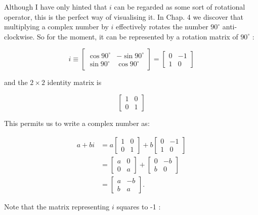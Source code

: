 \documentclass[10pt]{article}
\begin{document}
Although I have only hinted that $i$ can be regarded as some sort of rotational operator, this is the perfect way of visualising it. In Chap. 4 we discover that multiplying a complex number by $i$ effectively rotates the number $90^{\circ}$ anti-clockwise. So for the moment, it can be represented by a rotation matrix of $90^{\circ}$ :

$$
i \equiv\left[\begin{array}{cc}
\cos 90^{\circ} & -\sin 90^{\circ} \\
\sin 90^{\circ} & \cos 90^{\circ}
\end{array}\right]=\left[\begin{array}{cc}
0 & -1 \\
1 & 0
\end{array}\right]
$$

and the $2 \times 2$ identity matrix is

$$
\left[\begin{array}{ll}
1 & 0 \\
0 & 1
\end{array}\right]
$$

This permits us to write a complex number as:

$$
\begin{aligned}
a+b i & =a\left[\begin{array}{ll}
1 & 0 \\
0 & 1
\end{array}\right]+b\left[\begin{array}{cc}
0 & -1 \\
1 & 0
\end{array}\right] \\
& =\left[\begin{array}{ll}
a & 0 \\
0 & a
\end{array}\right]+\left[\begin{array}{cc}
0 & -b \\
b & 0
\end{array}\right] \\
& =\left[\begin{array}{cc}
a & -b \\
b & a
\end{array}\right] .
\end{aligned}
$$

Note that the matrix representing $i$ squares to -1 :
\end{document}
